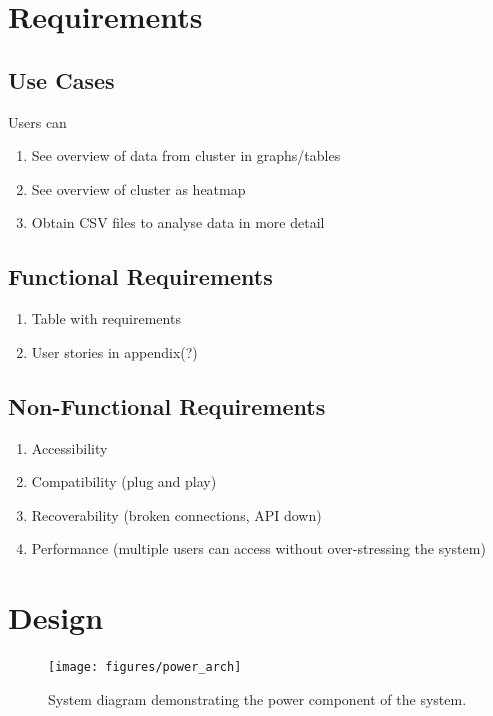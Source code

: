 \documentclass{l4proj}
\begin{document}
\chapter{Requirements}

\section{Use Cases}
Users can
\begin{enumerate}
	\item See overview of data from cluster in graphs/tables
	\item See overview of cluster as heatmap
	\item Obtain CSV files to analyse data in more detail
\end{enumerate}
\section{Functional Requirements}
\begin{enumerate}
	\item Table with requirements
	\item User stories in appendix(?)
\end{enumerate}
\section{Non-Functional Requirements}
\begin{enumerate}
	\item Accessibility
	\item Compatibility (plug and play)
	\item Recoverability (broken connections, API down)
	\item Performance (multiple users can access without over-stressing the system)
\end{enumerate}

\chapter{Design}
\begin{figure}[!ht]
  \caption{System diagram demonstrating the power component of the system.}
  \centering
    \texttt{[image: figures/power\_arch]}
\end{figure}
\end{document}
